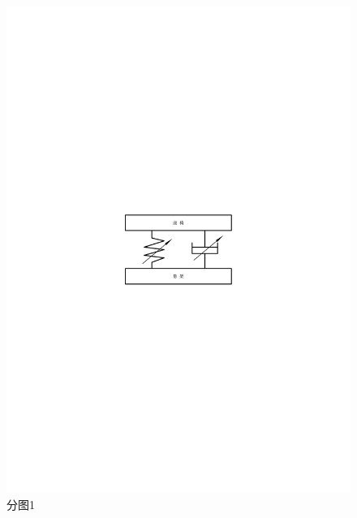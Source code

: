\begin{figure}[!htbp]
	\begin{center}
		\begin{minipage}[c]{0.44\textwidth}
			\centering		\includegraphics{pic/fig2-1}
			\caption{分图1}	\label{fig2-1}
		\end{minipage}%
		\begin{minipage}[c]{0.56\textwidth}

\end{minipage}
\end{center}
\end{figure}
